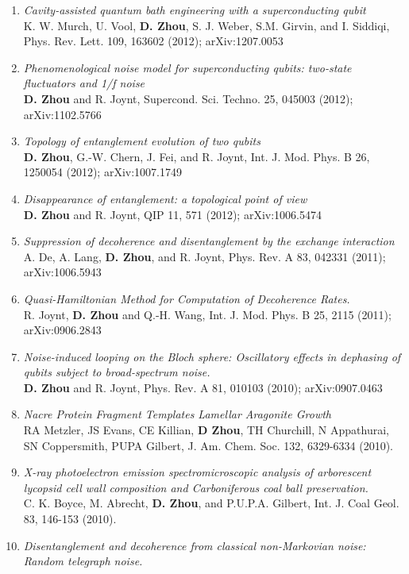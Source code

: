 \documentclass[centered,11pt,overlapped]{res}
\begin{document}
\begin{resume}
{\begin{enumerate}[leftmargin=-0.1in]
\item{\em Cavity-assisted quantum bath engineering with a superconducting qubit}\\
K. W. Murch, U. Vool, {\bf D. Zhou}, S. J. Weber, S.M. Girvin, and I. Siddiqi,
Phys. Rev. Lett. 109, 163602 (2012); arXiv:1207.0053
\item{\em Phenomenological noise model for superconducting qubits:
two-state fluctuators and 1/f noise}\\
{\bf D. Zhou} and R. Joynt, Supercond. Sci. Techno. 25, 045003 (2012); arXiv:1102.5766 
\item{\em Topology of entanglement evolution of two qubits}\\
{\bf D. Zhou}, G.-W. Chern, J. Fei, and R. Joynt, 
        Int. J. Mod. Phys. B 26, 1250054 (2012); arXiv:1007.1749
\item{\em Disappearance of entanglement: a topological point of view} \\
{\bf D. Zhou} and R. Joynt, QIP 11, 571 (2012); arXiv:1006.5474
\item{\em Suppression of decoherence and disentanglement by the exchange interaction}\\
A. De, A. Lang, {\bf D. Zhou}, and R. Joynt, Phys. Rev. A 83, 042331 (2011); arXiv:1006.5943
\item {\em Quasi-Hamiltonian Method for Computation of Decoherence Rates.}\\
R. Joynt, {\bf D. Zhou} and Q.-H. Wang, Int. J. Mod. Phys. B 25, 2115 (2011); arXiv:0906.2843
\item {\em Noise-induced looping on the Bloch sphere: Oscillatory effects in dephasing of qubits subject to broad-spectrum noise.}\\
{\bf D. Zhou} and R. Joynt, Phys. Rev. A 81, 010103 (2010); arXiv:0907.0463 
\item {\em Nacre Protein Fragment Templates Lamellar Aragonite Growth}\\
RA Metzler, JS Evans, CE Killian, {\bf D Zhou}, TH Churchill, N Appathurai, SN Coppersmith, PUPA Gilbert, J. Am. Chem. Soc. 132, 6329-6334 (2010). 
\item {\em X-ray photoelectron emission spectromicroscopic analysis of arborescent lycopsid cell wall composition and Carboniferous coal ball preservation.}\\
C. K. Boyce, M. Abrecht, {\bf D. Zhou}, and P.U.P.A. Gilbert, Int. J. Coal Geol. 83, 146-153 (2010).
\item {\em Disentanglement and decoherence from classical non-Markovian noise: Random telegraph noise.}\\

\end{enumerate}}
\end{resume}
\end{document}
